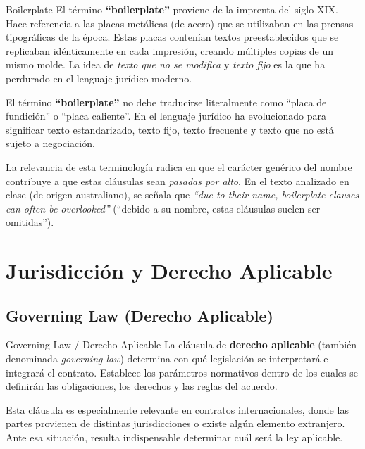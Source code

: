 \documentclass[12pt,oneside]{book}
\begin{document}
\begin{definition}{Boilerplate}
El término \textbf{``boilerplate''} proviene de la imprenta del siglo XIX.
Hace referencia a las placas metálicas (de acero) que se utilizaban en las
prensas tipográficas de la época. Estas placas contenían textos
preestablecidos que se replicaban idénticamente en cada impresión, creando
múltiples copias de un mismo molde. La idea de \emph{texto que no se
modifica} y \emph{texto fijo} es la que ha perdurado en el lenguaje
jurídico moderno.
\end{definition}

\begin{important}
El término \textbf{``boilerplate''} no debe traducirse literalmente como
``placa de fundición'' o ``placa caliente''. En el lenguaje jurídico ha
evolucionado para significar texto estandarizado, texto fijo, texto
frecuente y texto que no está sujeto a negociación.
\end{important}

La relevancia de esta terminología radica en que el carácter genérico del
nombre contribuye a que estas cláusulas sean \emph{pasadas por alto}. En
el texto analizado en clase (de origen australiano), se señala que
\textit{``due to their name, boilerplate clauses can often be overlooked''}
(``debido a su nombre, estas cláusulas suelen ser omitidas'').

\chapter{Jurisdicción y Derecho Aplicable}

\section{Governing Law (Derecho Aplicable)}

\begin{definition}{Governing Law / Derecho Aplicable}
La cláusula de \textbf{derecho aplicable} (también denominada
\textit{governing law}) determina con qué legislación se interpretará e
integrará el contrato. Establece los parámetros normativos dentro de los
cuales se definirán las obligaciones, los derechos y las reglas del acuerdo.
\end{definition}

Esta cláusula es especialmente relevante en contratos internacionales, donde
las partes provienen de distintas jurisdicciones o existe algún elemento
extranjero. Ante esa situación, resulta indispensable determinar cuál será
la ley aplicable.
\end{document}
